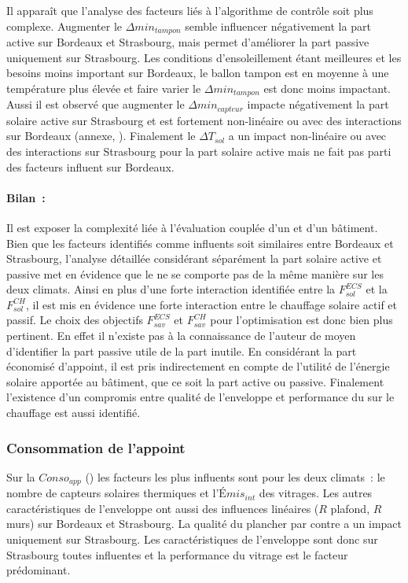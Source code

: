 Il apparaît que l’analyse des facteurs liés à l’algorithme de contrôle soit plus complexe.
Augmenter le $\Delta min_{tampon}$ semble influencer négativement la part active sur
Bordeaux et Strasbourg, mais permet d’améliorer la part passive uniquement sur
Strasbourg. Les conditions d’ensoleillement étant meilleures et les besoins moins
important sur Bordeaux, le ballon tampon est en moyenne à une température plus élevée et
faire varier le $\Delta min_{tampon}$ est donc moins impactant. Aussi il est observé que
augmenter le $\Delta min_{capteur}$ impacte négativement la part solaire active sur
Strasbourg et est fortement non-linéaire ou avec des interactions sur Bordeaux (annexe,
). Finalement le $\Delta T_{sol}$ a un impact
non-linéaire ou avec des interactions sur Strasbourg pour la part solaire active mais ne fait
pas parti des facteurs influent sur Bordeaux.

\paragraph{Bilan~:} %
\label{par:bilan_prod_sol_chauff}
Il est exposer la complexité liée à l’évaluation couplée d’un  et d’un bâtiment.
Bien que les facteurs identifiés comme influents soit similaires entre Bordeaux et
Strasbourg, l’analyse détaillée considérant séparément la part solaire active et passive
met en évidence que le  ne se comporte pas de la même manière sur les deux
climats. Ainsi en plus d’une forte interaction identifiée entre la $F_{sol}^{ECS}$ et la
$F_{sol}^{CH}$, il est mis en évidence une forte interaction entre le chauffage solaire
actif et passif. Le choix des objectifs $F_{sav}^{ECS}$ et $F_{sav}^{CH}$ pour
l’optimisation est donc bien plus pertinent. En effet il n’existe pas à la connaissance de
l’auteur de moyen d’identifier la part passive utile de la part inutile. En considérant la
part économisé d’appoint, il est pris indirectement en compte de l’utilité de l’énergie
solaire apportée au bâtiment, que ce soit la part active ou passive. Finalement
l’existence d’un compromis entre qualité de l’enveloppe et performance du  sur le
chauffage est aussi identifié.


\subsubsection{Consommation de l’appoint} %
\label{ssub:consommation_de_l_appoint}
Sur la $Conso_{app}$ () les facteurs les plus influents sont
pour les deux climats~: le nombre de capteurs solaires thermiques et l’$Émis_{int}$ des
vitrages. Les autres caractéristiques de l’enveloppe ont aussi des influences linéaires
($R$ plafond, $R$ murs) sur Bordeaux et Strasbourg. La qualité du plancher par contre a un
impact uniquement sur Strasbourg. Les caractéristiques de l’enveloppe sont donc sur
Strasbourg toutes influentes et la performance du vitrage est le facteur prédominant.


